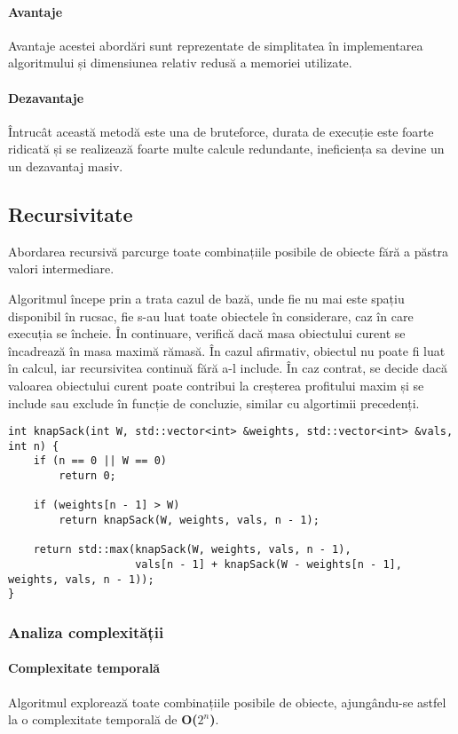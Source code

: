 \documentclass[runningheads]{llncs}
\begin{document}
{\paragraph{Avantaje} Avantaje acestei abordări sunt reprezentate de simplitatea în implementarea
algoritmului și dimensiunea relativ redusă a memoriei utilizate.

\paragraph{Dezavantaje} Întrucât această metodă este una de bruteforce, durata de execuție este
foarte ridicată și se realizează foarte multe calcule redundante, ineficiența sa devine un
un dezavantaj masiv.

\subsection{Recursivitate}

Abordarea recursivă parcurge toate combinațiile posibile de obiecte fără a păstra valori intermediare.

Algoritmul începe prin a trata cazul de bază, unde fie nu mai este spațiu disponibil
în rucsac, fie s-au luat toate obiectele în considerare, caz în care execuția se încheie.
În continuare, verifică dacă masa obiectului curent se încadrează în masa maximă rămasă.
În cazul afirmativ, obiectul nu poate fi luat în calcul, iar recursivitea continuă fără
a-l include. În caz contrat, se decide dacă valoarea obiectului curent poate contribui la creșterea
profitului maxim și se include sau exclude în funcție de concluzie, similar cu algortimii precedenți.

\begin{lstlisting}
int knapSack(int W, std::vector<int> &weights, std::vector<int> &vals, int n) {
	if (n == 0 || W == 0)
		return 0;

	if (weights[n - 1] > W)
		return knapSack(W, weights, vals, n - 1);

	return std::max(knapSack(W, weights, vals, n - 1),
					vals[n - 1] + knapSack(W - weights[n - 1], weights, vals, n - 1));
}
\end{lstlisting}

\subsubsection{Analiza complexității}

\paragraph{Complexitate temporală} Algoritmul explorează toate combinațiile posibile de obiecte,
ajungându-se astfel la o complexitate temporală de \textbf{O($2^n$)}.

}
\end{document}
